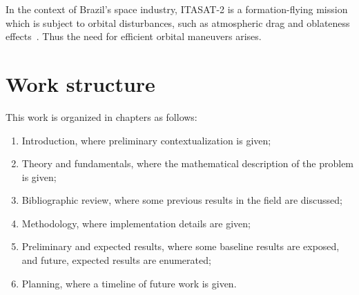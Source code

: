 In the context of Brazil's space industry, ITASAT-2 is a formation-flying mission which is subject to orbital disturbances, such as atmospheric drag and oblateness effects~\cite{itasat2}. Thus the need for efficient orbital maneuvers arises.


\section{Work structure}

This work is organized in chapters as follows:
\begin{enumerate}
    \item Introduction, where preliminary contextualization is given;
    \item Theory and fundamentals, where the mathematical description of the problem is given;
    \item Bibliographic review, where some previous results in the field are discussed;
    \item Methodology, where implementation details are given;
    \item Preliminary and expected results, where some baseline results are exposed, and future, expected results are enumerated;
    \item Planning, where a timeline of future work is given.
\end{enumerate}